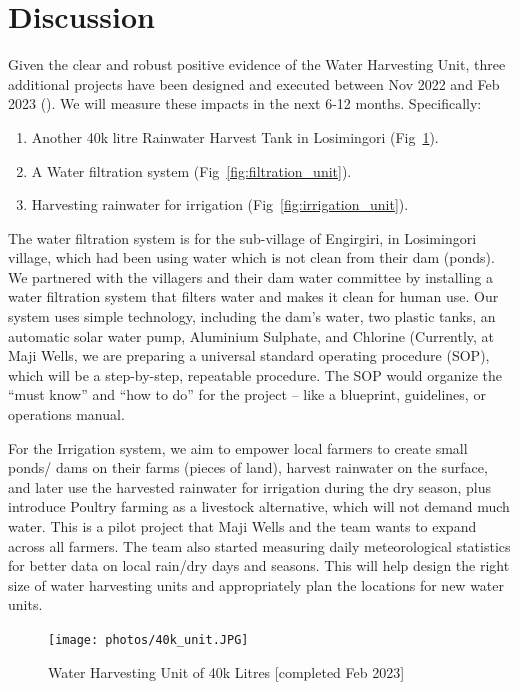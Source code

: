 \documentclass[10pt, twocolumn]{article}
\begin{document}
\section{Discussion}

Given the clear and robust positive evidence of the Water Harvesting Unit, three additional projects have been designed and executed between Nov 2022 and Feb 2023 (\autocite{Karimu}). We will measure these impacts in the next 6-12 months. Specifically:

\begin{enumerate}
    \item Another 40k litre Rainwater Harvest Tank in Losimingori (Fig~\ref{fig:40k_unit}).
    \item A Water filtration system (Fig~\ref{fig:filtration_unit}).
    \item Harvesting rainwater for irrigation (Fig~\ref{fig:irrigation_unit}).
\end{enumerate}

The water filtration system is for the sub-village of Engirgiri, in Losimingori village, which had been using water which is not clean from their dam (ponds). We partnered with the villagers and their dam water committee by installing a water filtration system that filters water and makes it clean for human use. Our system uses simple technology, including the dam's water, two plastic tanks, an automatic solar water pump, Aluminium Sulphate, and Chlorine (Currently, at Maji Wells, we are preparing a universal standard operating procedure (SOP), which will be a step-by-step, repeatable procedure. The SOP would organize the “must know” and “how to do” for the project – like a blueprint, guidelines, or operations manual.

For the Irrigation system, we aim to empower local farmers to create small ponds/ dams on their farms (pieces of land), harvest rainwater on the surface, and later use the harvested rainwater for irrigation during the dry season, plus introduce Poultry farming as a livestock alternative, which will not demand much water. This is a pilot project that Maji Wells and the team wants to expand across all farmers. The team also started measuring daily meteorological statistics for better data on local rain/dry days and seasons. This will help design the right size of water harvesting units and appropriately plan the locations for new water units.

\begin{figure}
    \centering
    \texttt{[image: photos/40k\_unit.JPG]}
    \caption{Water Harvesting Unit of 40k Litres [completed Feb 2023]}
    \label{fig:40k_unit}
\end{figure}
\end{document}
